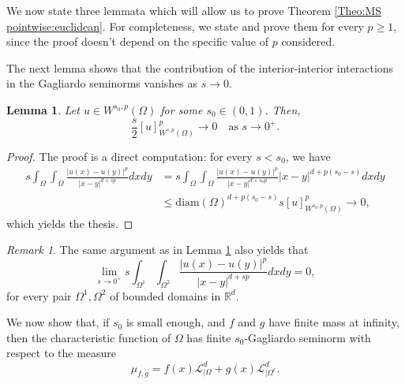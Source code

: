 \documentclass[reqno,11pt]{amsart}
\numberwithin{equation}{section}
\theoremstyle{definition} %
\theoremstyle{plain}
\newtheorem{lemma}[lemma]{Lemma}
\theoremstyle{definition}
\theoremstyle{remark}
\newtheorem{remark}[remark]{Remark}
\def\O{\Omega}
\def\semin#1#2{ [#1 ]_{#2}}
\def\R{\mathbb{R}}
\newcommand{\abs}[1]{\left|#1\right|}
\begin{document}
We now state three lemmata which will allow us to prove Theorem \ref{Theo:MS pointwise:euclidean}. For completeness, we state and prove them for every $p\geq 1$, since the proof doesn't depend on the specific value of $p$ considered.

The next lemma shows that the contribution of the interior-interior interactions in the Gagliardo seminorms vanishes as $s\to 0$.

\begin{lemma}
\label{lemma:Vanishes}
Let $u\in W^{s_0,p}(\O)$ for some $s_0\in(0,1)$. Then,
\begin{equation}
    \frac{s}{2}\semin{u}{W^{s,p}(\Omega)}^p\to0\quad\text{as } s\to0^+.
\end{equation}
\end{lemma}
\begin{proof}
The proof is a direct computation: for every $s<s_0$, we have
\begin{equation*}
    \begin{split}
        s\int_\O\int_\O\frac{\abs{u(x)-u(y)}^p}{\abs{x-y}^{d+sp}}dxdy&=s\int_\O\int_\O\frac{\abs{u(x)-u(y)}^p}{\abs{x-y}^{d+s_0p}}\abs{x-y}^{d+p(s_0-s)}dxdy\\
        &\leq \mathrm{diam}(\O)^{d+p(s_0-s)}s[u]_{W^{s_0,p}(\O)}^p\to0,
    \end{split}
\end{equation*}
which yields the thesis.
\end{proof}
\begin{remark}
\label{rk:seminormalimitati}
The same argument as in Lemma \ref{lemma:Vanishes} also yields that
\begin{equation*}
    \lim_{s\to 0^+}s\int_{\O^1}\int_{\O^2}\frac{\abs{u(x)-u(y)}^p}{\abs{x-y}^{d+sp}}dxdy=0,
\end{equation*}
for every pair $\O^1,\O^2$ of bounded domains in $\R^d$.
\end{remark}
We now show that, if $s_0$ is small enough, and $f$ and $g$ have finite mass at infinity, then the characteristic function of $\Omega$ has finite $s_0$-Gagliardo seminorm with respect to the measure
\begin{equation}\label{eq:def misura mista}
    \mu_{f,g}=f(x)\mathcal{L}^d_{\mid\O}+g(x)\mathcal{L}^d_{\mid\O^c}.
\end{equation}
\end{document}
